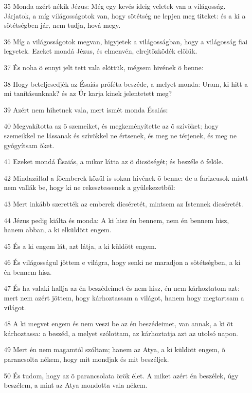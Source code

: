 \par 35 Monda azért nékik Jézus: Még egy kevés ideig veletek van a világosság. Járjatok, a míg világosságotok van, hogy sötétség ne lepjen meg titeket: és a ki a sötétségben jár, nem tudja,  hová megy.
\par 36 Míg a világosságotok megvan, higyjetek a világosságban, hogy a világosság fiai legyetek. Ezeket mondá Jézus, és elmenvén, elrejtõzködék elõlük.
\par 37 És noha õ ennyi jelt tett vala elõttük, mégsem hivének õ benne:
\par 38 Hogy beteljesedjék az Ésaiás próféta beszéde, a melyet monda: Uram, ki hitt a mi tanításunknak? és az Úr karja kinek jelentetett meg?
\par 39 Azért nem hihetnek vala, mert ismét monda Ésaiás:
\par 40 Megvakította az õ szemeiket, és megkeményítette az õ szívöket; hogy szemeikkel ne lássanak és szívökkel ne értsenek, és meg ne térjenek, és meg ne gyógyítsam õket.
\par 41 Ezeket mondá Ésaiás, a mikor látta az õ dicsõségét; és beszéle õ felõle.
\par 42 Mindazáltal a fõemberek közül is sokan hivének õ benne: de a farizeusok miatt nem vallák be, hogy ki ne rekesztessenek a gyülekezetbõl:
\par 43 Mert inkább szerették az emberek dicséretét, mintsem az Istennek dicséretét.
\par 44 Jézus pedig kiálta és monda: A ki hisz én bennem, nem én bennem hisz, hanem abban, a ki elküldött engem.
\par 45 És a ki engem lát, azt látja, a ki küldött engem.
\par 46 És világosságul jöttem e világra, hogy senki ne maradjon a sötétségben, a ki én bennem hisz.
\par 47 És ha valaki hallja az én beszédeimet és nem hisz, én nem kárhoztatom azt: mert nem azért jöttem, hogy kárhoztassam a világot, hanem hogy megtartsam a világot.
\par 48 A ki megvet engem és nem veszi be az én beszédeimet, van annak, a ki õt kárhoztassa: a beszéd, a melyet szólottam, az kárhoztatja azt az utolsó napon.
\par 49 Mert én nem magamtól szóltam; hanem az Atya, a ki küldött engem, õ parancsolta nékem, hogy mit mondjak és mit beszéljek.
\par 50 És tudom, hogy az õ parancsolata örök élet. A miket azért én beszélek, úgy beszélem, a mint az Atya mondotta vala nékem.

